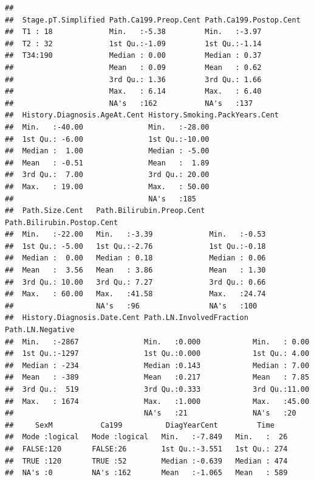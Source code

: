 \documentclass{article}\usepackage[]{graphicx}\usepackage[]{color}
\makeatletter
\newenvironment{kframe}{%
 \def\at@end@of@kframe{}%
 \ifinner\ifhmode%
  \def\at@end@of@kframe{\end{minipage}}%
  \begin{minipage}{\columnwidth}%
 \fi\fi%
 \def\FrameCommand##1{\hskip\@totalleftmargin \hskip-\fboxsep
 \colorbox{shadecolor}{##1}\hskip-\fboxsep
     \hskip-\linewidth \hskip-\@totalleftmargin \hskip\columnwidth}%
 \MakeFramed {\advance\hsize-\width
   \@totalleftmargin\z@ \linewidth\hsize
   \@setminipage}}%
 {\par\unskip\endMakeFramed%
 \at@end@of@kframe}
\newenvironment{knitrout}{}{} %
\makeatother
\begin{document}
\begin{knitrout}
\begin{kframe}
\begin{verbatim}
##                                                                 
##  Stage.pT.Simplified Path.Ca199.Preop.Cent Path.Ca199.Postop.Cent
##  T1 : 18             Min.   :-5.38         Min.   :-3.97         
##  T2 : 32             1st Qu.:-1.09         1st Qu.:-1.14         
##  T34:190             Median : 0.00         Median : 0.37         
##                      Mean   : 0.09         Mean   : 0.62         
##                      3rd Qu.: 1.36         3rd Qu.: 1.66         
##                      Max.   : 6.14         Max.   : 6.40         
##                      NA's   :162           NA's   :137           
##  History.Diagnosis.AgeAt.Cent History.Smoking.PackYears.Cent
##  Min.   :-40.00               Min.   :-28.00                
##  1st Qu.: -6.00               1st Qu.:-10.00                
##  Median :  1.00               Median : -5.00                
##  Mean   : -0.51               Mean   :  1.89                
##  3rd Qu.:  7.00               3rd Qu.: 20.00                
##  Max.   : 19.00               Max.   : 50.00                
##                               NA's   :185                   
##  Path.Size.Cent   Path.Bilirubin.Preop.Cent Path.Bilirubin.Postop.Cent
##  Min.   :-22.00   Min.   :-3.39             Min.   :-0.53             
##  1st Qu.: -5.00   1st Qu.:-2.76             1st Qu.:-0.18             
##  Median :  0.00   Median : 0.18             Median : 0.06             
##  Mean   :  3.56   Mean   : 3.86             Mean   : 1.30             
##  3rd Qu.: 10.00   3rd Qu.: 7.27             3rd Qu.: 0.66             
##  Max.   : 60.00   Max.   :41.58             Max.   :24.74             
##                   NA's   :96                NA's   :100               
##  History.Diagnosis.Date.Cent Path.LN.InvolvedFraction Path.LN.Negative
##  Min.   :-2867               Min.   :0.000            Min.   : 0.00   
##  1st Qu.:-1297               1st Qu.:0.000            1st Qu.: 4.00   
##  Median : -234               Median :0.143            Median : 7.00   
##  Mean   : -389               Mean   :0.217            Mean   : 7.85   
##  3rd Qu.:  519               3rd Qu.:0.333            3rd Qu.:11.00   
##  Max.   : 1674               Max.   :1.000            Max.   :45.00   
##                              NA's   :21               NA's   :20      
##     SexM           Ca199          DiagYearCent         Time     
##  Mode :logical   Mode :logical   Min.   :-7.849   Min.   :  26  
##  FALSE:120       FALSE:26        1st Qu.:-3.551   1st Qu.: 274  
##  TRUE :120       TRUE :52        Median :-0.639   Median : 474  
##  NA's :0         NA's :162       Mean   :-1.065   Mean   : 589  

\end{verbatim}
\end{kframe}
\end{knitrout}
\end{document}
